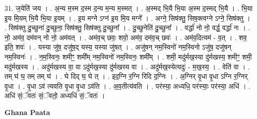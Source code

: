 \documentclass[17pt]{extarticle}
\begin{document}
31. ज॒येति॑ जय । . अ॒न्य म॒स्म द॒स्म द॒न्य म॒न्य म॒स्मत् । . अ॒स्मद् भि॒यै भि॒या अ॒स्म द॒स्मद् भि॒यै । . भि॒या इ॒य मि॒यम् भि॒यै भि॒या इ॒यम् । . इ॒य मग्ने ऽग्न॑ इ॒य मि॒य मग्ने᳚ । . अग्ने॒ सिष॑क्तु॒ सिष॒क्त्वग्ने ऽग्ने॒ सिष॑क्तु । . सिष॑क्तु दु॒च्छुना॑ दु॒च्छुना॒ सिष॑क्तु॒ सिष॑क्तु दु॒च्छुना᳚ । . दु॒च्छुनेति॑ दु॒च्छुना᳚ । . वर्द्धा॑ नो नो॒ वर्द्ध॒ वर्द्धा॑ नः । . नो॒ अम॑व॒ दम॑वन् नो नो॒ अम॑वत् । . अम॑व॒च् छवः॒ शवो॒ अम॑व॒ दम॑व॒च् छवः॑ । . अम॑व॒दित्यम॑ - व॒त् । . शव॒ इति॒ शवः॑ । . यस्या जु॑ष॒ दजु॑ष॒द् यस्य॒ यस्या जु॑षत् । . अजु॑षन् नम॒स्विनो॑ नम॒स्विनो ऽजु॑ष॒ दजु॑षन् नम॒स्विनः॑ । . न॒म॒स्विनः॒ शमीꣳ॒॒ शमी᳚म् नम॒स्विनो॑ नम॒स्विनः॒ शमी᳚म् । . शमी॒ मदु॑र्मख॒स्या दु॑र्मखस्य॒ शमीꣳ॒॒ शमी॒ मदु॑र्मखस्य । . अदु॑र्मखस्य वा॒ वा ऽदु॑र्मख॒स्या दु॑र्मखस्य वा । . अदु॑र्मख॒स्येत्यदुः॑ - म॒ख॒स्य॒ । . वेति॑ वा । . तम् घ॑ घ॒ तम् तम् घ॑ । . घे दिद् घ॒ घे त् । . इद॒ग्नि र॒ग्नि रिदि द॒ग्निः । . अ॒ग्निर् वृ॒धा वृ॒धा ऽग्नि र॒ग्निर् वृ॒धा । . वृ॒धा ऽव॑ त्यवति वृ॒धा वृ॒धा ऽव॑ति । . अ॒व॒तीत्य॑वति । . पर॑स्या॒ अध्यधि॒ पर॑स्याः॒ पर॑स्या॒ अधि॑ । . अधि॑ सं॒ॅवतः॑ सं॒ॅवतो॒ अध्यधि॑ सं॒ॅवतः॑ । \newline

\textbf{Ghana Paata } \newline
\end{document}
